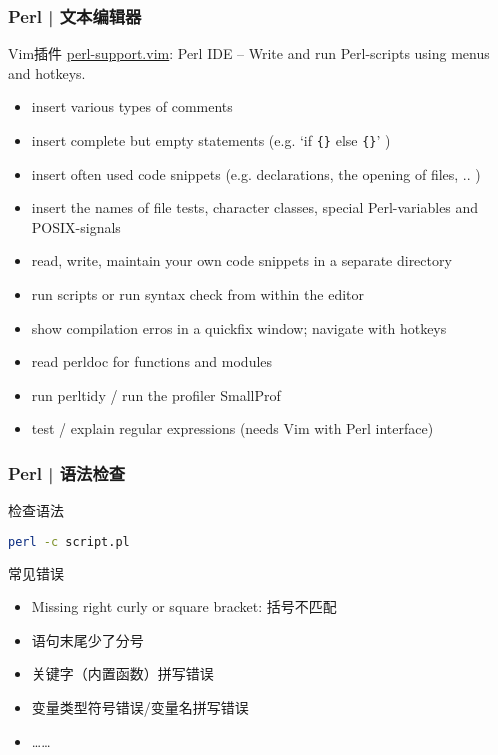\begin{frame}[fragile]
  \frametitle{Perl | 文本编辑器}
  \begin{block}{Vim插件}
    \href{https://github.com/vim-scripts/perl-support.vim}{perl-support.vim}: Perl IDE -- Write and run Perl-scripts using menus and hotkeys.
  \end{block}
  {\footnotesize
  \begin{itemize}
    \item insert various types of comments
    \item insert complete but empty statements (e.g. `if \verb|{}| else \verb|{}|' )
    \item insert often used code snippets (e.g. declarations, the opening of files, .. )
    \item insert the names of file tests, character classes, special Perl-variables and POSIX-signals
    \item read, write, maintain your own code snippets in a separate directory
    \item run scripts or run syntax check from within the editor
    \item show compilation erros in a quickfix window; navigate with hotkeys 
    \item read perldoc for functions and modules 
    \item run perltidy / run the profiler SmallProf
    \item test / explain regular expressions (needs Vim with Perl interface)
  \end{itemize}
}
\end{frame}

\begin{frame}[fragile]
  \frametitle{Perl | 语法检查}
  \begin{block}{\alert{检查语法}}
\begin{lstlisting}[language=bash]
perl -c script.pl
\end{lstlisting}
  \end{block}
  \pause
  \begin{block}{常见错误}
    \begin{itemize}
      \item Missing right curly or square bracket: 括号不匹配
      \item 语句末尾少了分号
      \item 关键字（内置函数）拼写错误
      \item 变量类型符号错误/变量名拼写错误
      \item ……
    \end{itemize}
  \end{block}
\end{frame}

